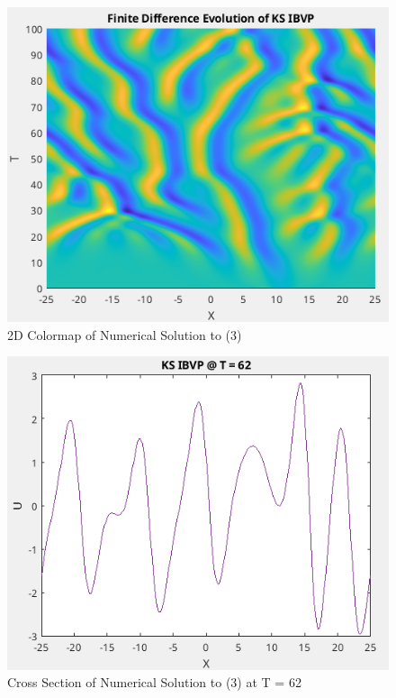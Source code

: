 \documentclass[10pt,english]{article}
\begin{document}
\begin{figure}[ht]
    \centering
    \includegraphics[width=.5\textwidth]{q3_colormap.png}
    \caption{2D Colormap of Numerical Solution to (3)}
\end{figure}
\begin{figure}[ht]
    \centering
    \includegraphics[width=.5\textwidth]{q3t62.png}
    \caption{Cross Section of Numerical Solution to (3) at T = 62}
\end{figure}
\end{document}
